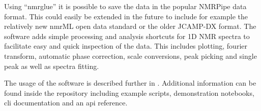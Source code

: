 Using \enquote{nmrglue}  it is possible to save the data in the popular NMRPipe  data format. This could easily be extended in the future to include for example the relatively new nmrML open data standard or the older JCAMP-DX  format. The software adds simple processing and analysis shortcuts for 1D NMR spectra to facilitate easy and quick inspection of the data. This includes plotting, fourier transform, automatic phase correction, scale conversions, peak picking and single peak as well as spectra fitting.

The usage of the software is described further in . Additional information can be found inside the repository including example scripts, demonstration notebooks, \acrshort{cli} documentation and an \acrshort{api} reference.
